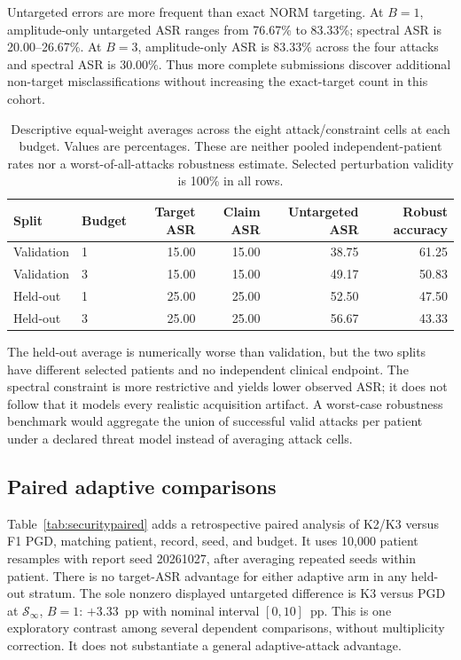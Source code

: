Untargeted errors are more frequent than exact NORM targeting. At $B=1$, amplitude-only untargeted ASR ranges from 76.67\% to 83.33\%; spectral ASR is 20.00--26.67\%. At $B=3$, amplitude-only ASR is 83.33\% across the four attacks and spectral ASR is 30.00\%. Thus more complete submissions discover additional non-target misclassifications without increasing the exact-target count in this cohort.

\begin{table}[htbp]\centering\small
\begin{tabular}{llrrrr}\toprule
Split & Budget & Target ASR & Claim ASR & Untargeted ASR & Robust accuracy\\\midrule
Validation & 1 & 15.00 & 15.00 & 38.75 & 61.25\\
Validation & 3 & 15.00 & 15.00 & 49.17 & 50.83\\
Held-out & 1 & 25.00 & 25.00 & 52.50 & 47.50\\
Held-out & 3 & 25.00 & 25.00 & 56.67 & 43.33\\\bottomrule
\end{tabular}
\caption{Descriptive equal-weight averages across the eight attack/constraint cells at each budget. Values are percentages. These are neither pooled independent-patient rates nor a worst-of-all-attacks robustness estimate. Selected perturbation validity is 100\% in all rows.}\label{tab:securitymacro}\end{table}

The held-out average is numerically worse than validation, but the two splits have different selected patients and no independent clinical endpoint. The spectral constraint is more restrictive and yields lower observed ASR; it does not follow that it models every realistic acquisition artifact. A worst-case robustness benchmark would aggregate the union of successful valid attacks per patient under a declared threat model instead of averaging attack cells.

\subsection{Paired adaptive comparisons}
Table~\ref{tab:securitypaired} adds a retrospective paired analysis of K2/K3 versus F1 PGD, matching patient, record, seed, and budget. It uses 10,000 patient resamples with report seed 20261027, after averaging repeated seeds within patient. There is no target-ASR advantage for either adaptive arm in any held-out stratum. The sole nonzero displayed untargeted difference is K3 versus PGD at $\mathcal S_\infty$, $B=1$: $+3.33$~pp with nominal interval $[0,10]$~pp. This is one exploratory contrast among several dependent comparisons, without multiplicity correction. It does not substantiate a general adaptive-attack advantage.

